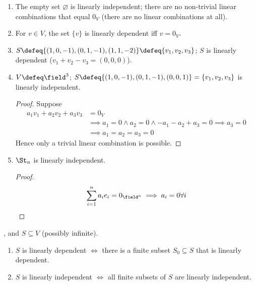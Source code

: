 \begin{example}
    \begin{enumerate}
        \item The empty set $\varnothing$ is linearly independent; there are no non-trivial linear combinations that equal $0_V$ (there are no linear combinations at all).
        \item For $v \in V$, the set $\{v\}$ is linearly dependent iff $v = 0_V$.
        \item $S \defeq \{(1,0,-1), (0,1,-1), (1,1,-2)\} \defeq \{v_1, v_2, v_3\}$; $S$ is linearly dependent ($v_1 + v_2 - v_3 = (0,0,0)$).
        \item $V \defeq \field^3$; $S \defeq \{(1,0,-1), (0,1,-1), (0,0,1)\} = \{v_1, v_2, v_3\}$ is linearly independent.
        \begin{proof}
            Suppose
            \begin{align*}
                a_1v_1 + a_2 v_2 + a_3 v_3 &= 0_V\\
                &\implies a_1 = 0 \wedge a_2 = 0 \wedge -a_1 - a_2 + a_3 = 0 \implies a_3 = 0\\
                &\implies a_1 = a_2 = a_3 = 0
            \end{align*}
            Hence only a trivial linear combination is possible.
        \end{proof}
        \item $\St_n$ is linearly independent.
        \begin{proof}
            \begin{align*}
                \sum_{i=1}^n a_i e_i = 0_{\field^n} \implies a_i = 0 \forall i
            \end{align*}
        \end{proof}
    \end{enumerate}
\end{example}

\begin{lemma}
     , and $S \subseteq V$ (possibly infinite). \begin{enumerate}
        \item $S$ is linearly dependent $\iff$ there is a finite subset $S_0 \subseteq S$ that is linearly dependent.
        \item $S$ is linearly independent $\iff$ all finite subsets of $S$ are linearly independent.
    \end{enumerate}
\end{lemma}

